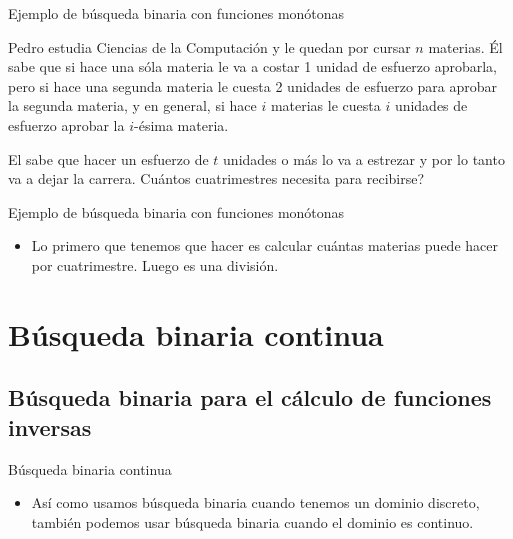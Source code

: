 \documentclass[compress]{beamer}
\begin{document}
\begin{frame}{Ejemplo de b\'usqueda binaria con funciones mon\'otonas}

Pedro estudia Ciencias de la Computaci\'on y le quedan por cursar $n$ materias. \'El sabe que si hace una s\'ola materia le va a costar 1 unidad de esfuerzo aprobarla, pero si hace una segunda materia le cuesta 2 unidades de esfuerzo para aprobar la segunda materia, y en general, si hace $i$ materias le cuesta $i$ unidades de esfuerzo aprobar la $i$-\'esima materia.

El sabe que hacer un esfuerzo de $t$ unidades o m\'as lo va a estrezar y por lo tanto va a dejar la carrera. Cu\'antos cuatrimestres necesita para recibirse?

\end{frame}

\begin{frame}{Ejemplo de b\'usqueda binaria con funciones mon\'otonas}

\begin{itemize}
\item Lo primero que tenemos que hacer es calcular cu\'antas materias puede hacer por cuatrimestre. Luego es una divisi\'on.
\pause
{}
\end{itemize}
\end{frame}
\section{B\'usqueda binaria continua}

\subsection{B\'usqueda binaria para el c\'alculo de funciones inversas}

\begin{frame}{B\'usqueda binaria continua}
\begin{itemize}
\item As\'i como usamos b\'usqueda binaria cuando tenemos un dominio discreto, tambi\'en podemos usar b\'usqueda binaria cuando el dominio es continuo.
\pause
{}
\pause
{}
\end{itemize}
\end{frame}
\end{document}

